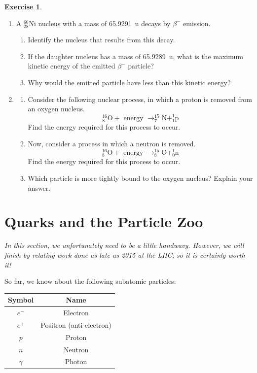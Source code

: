 \documentclass[a4paper]{amsbook}
\theoremstyle{definition}
\newtheorem{exercise}{Exercise}
\numberwithin{exercise}{chapter}
\numberwithin{exercise}{chapter}
\begin{document}
\begin{exercise}
\begin{enumerate}
    \item A $ ^{66}_{28}\mathrm{Ni} $ nucleus with a mass of \SI{65.9291}{\amu} decays by $ \beta^- $ emission.
      \begin{enumerate}
        \item Identify the nucleus that results from this decay.
        \item If the daughter nucleus has a mass of \SI{65.9289}{\amu}, what is the maximum kinetic energy of the emitted $ \beta^- $ particle?
        \item Why would the emitted particle have less than this kinetic energy?
      \end{enumerate}
    \item
      \begin{enumerate}
        \item Consider the following nuclear process, in which a proton is removed from an oxygen nucleus.
              \begin{displaymath}
                ^{16}_8\mathrm{O} + \text{ energy } \rightarrow ^{15}_{7}\mathrm{N} + ^1_1\mathrm{p}
              \end{displaymath}
              Find the energy required for this process to occur.
        \item Now, consider a process in which a neutron is removed.
              \begin{displaymath}
                ^{16}_8\mathrm{O} + \text{ energy } \rightarrow ^{15}_{8}\mathrm{O} + ^1_0\mathrm{n}
              \end{displaymath}
              Find the energy required for this process to occur.
        \item Which particle is more tightly bound to the oxygen nucleus? Explain your answer.
      \end{enumerate}
  \end{enumerate}
\end{exercise}

\section{Quarks and the Particle Zoo}
\emph{In this section, we unfortunately need to be a little handwavy. However, we will finish by relating work done as late as 2015 at the LHC; so it is
certainly worth it!}

So far, we know about the following subatomic particles:
\begin{center}
  \def\arraystretch{1.5}
  \begin{tabular}{|c|c|}\hline
    \textbf{Symbol} & \textbf{Name}\\\hline
    $ e^- $ & Electron\\\hline
    $ e^+ $ & Positron (anti-electron)\\\hline
    $ p $ & Proton\\\hline
    $ n $ & Neutron\\\hline
    $ \gamma $ & Photon\\\hline
  \end{tabular}
\end{center}
\end{document}
